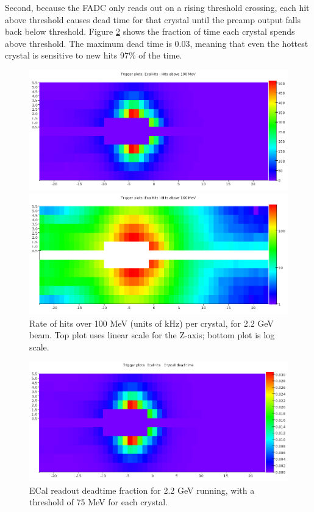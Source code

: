Second, because the FADC only reads out on a rising threshold crossing, each 
hit above threshold causes dead time for that crystal until the preamp output 
falls back below threshold. Figure \ref{fig:ecal_deadtime} shows the fraction 
of time each crystal spends above threshold. The maximum dead time is 0.03, 
meaning that even the hottest crystal is sensitive to new hits 97\% of the time.

\begin{figure}[ht]
	\includegraphics[width=\textwidth]{performance/ecal_rate_100mev_22}

	\includegraphics[width=\textwidth]{performance/ecal_rate_100mev_22_log}
	\caption{\small{Rate of hits over 100 MeV (units of kHz) per crystal, 
for 2.2 GeV beam. Top plot uses linear scale for the Z-axis; bottom plot is log scale.}}
	\label{fig:ecal_rate}
\end{figure}

\begin{figure}[ht]
	\includegraphics[width=\textwidth]{performance/ecal_deadtime_22}
	\caption{\small{ECal readout deadtime fraction for 2.2 GeV running, 
with a threshold of 75 MeV for each crystal.}}
	\label{fig:ecal_deadtime}
\end{figure}

